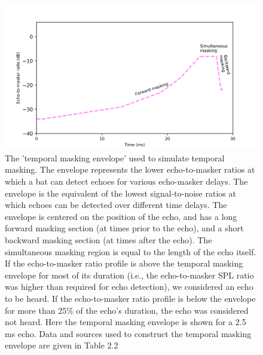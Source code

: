 \documentclass[
]{book}
\begin{document}
\newpage

\begin{figure}
\includegraphics[]{original_papers/CPN_figures/Figures_SI/Figure_S1.png}
\centering
\caption{ The 'temporal masking envelope' used to simulate temporal masking. The envelope represents the lower echo-to-masker ratios at which a bat can detect echoes for various echo-masker delays. The envelope is the equivalent of the lowest signal-to-noise ratios at which echoes can be detected over different time delays. The envelope is centered on the position of the echo, and has a long forward masking section (at times prior to the echo), and a short backward masking section (at times after the echo). The simultaneous masking region is equal to the length of the echo itself. If the echo-to-masker ratio profile is above the temporal masking envelope for most of its duration (i.e., the echo-to-masker SPL ratio was higher than required for echo detection), we considered an echo to be heard. If the echo-to-masker ratio profile is below the envelope for more than 25$\%$ of the echo's duration, the echo was considered not heard. Here the temporal masking envelope is shown for a 2.5 ms echo. Data and sources used to construct the temporal masking envelope are given in Table 2.2}
\label{cpn_figS1}
\end{figure}

\newpage
\end{document}

